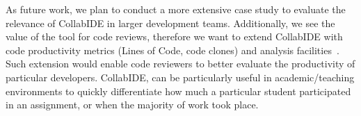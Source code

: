 As future work, we plan to conduct a more extensive case study to evaluate the relevance of CollabIDE 
in larger development teams. Additionally, we see the value of the tool for code reviews, therefore we 
want to extend CollabIDE with code productivity metrics (\eg Lines of Code, code clones) and analysis 
facilities~\cite{lienhard12}. Such extension would enable code reviewers to better evaluate the 
productivity of particular developers. CollabIDE, can be particularly useful in academic/teaching 
environments to quickly differentiate how much a particular student participated in an assignment, or 
when the majority of work took place.

\endinput
